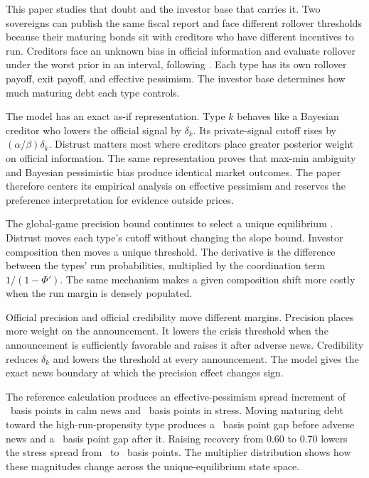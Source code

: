 \documentclass[11pt]{article}
\theoremstyle{definition}
\begin{document}
This paper studies that doubt and the investor base that carries it. Two sovereigns can publish the same fiscal report and face different rollover thresholds because their maturing bonds sit with creditors who have different incentives to run. Creditors face an unknown bias in official information and evaluate rollover under the worst prior in an interval, following \citet{GilboaSchmeidler1989}. Each type has its own rollover payoff, exit payoff, and effective pessimism. The investor base determines how much maturing debt each type controls.

The model has an exact as-if representation. Type $k$ behaves like a Bayesian creditor who lowers the official signal by $\delta_k$. Its private-signal cutoff rises by $(\alpha/\beta)\delta_k$. Distrust matters most where creditors place greater posterior weight on official information. The same representation proves that max-min ambiguity and Bayesian pessimistic bias produce identical market outcomes. The paper therefore centers its empirical analysis on effective pessimism and reserves the preference interpretation for evidence outside prices.

The global-game precision bound continues to select a unique equilibrium \citep{Hellwig2002,MorrisShin2003}. Distrust moves each type's cutoff without changing the slope bound. Investor composition then moves a unique threshold. The derivative is the difference between the types' run probabilities, multiplied by the coordination term $1/(1-\Phi')$. The same mechanism makes a given composition shift more costly when the run margin is densely populated.

Official precision and official credibility move different margins. Precision places more weight on the announcement. It lowers the crisis threshold when the announcement is sufficiently favorable and raises it after adverse news. Credibility reduces $\delta_k$ and lowers the threshold at every announcement. The model gives the exact news boundary at which the precision effect changes sign.

The reference calculation produces an effective-pessimism spread increment of \PremCalm\ basis points in calm news and \PremStress\ basis points in stress. Moving maturing debt toward the high-run-propensity type produces a \QTPremCalm\ basis point gap before adverse news and a \QTPremShock\ basis point gap after it. Raising recovery from 0.60 to 0.70 lowers the stress spread from \CACSBase\ to \CACSNew\ basis points. The multiplier distribution shows how these magnitudes change across the unique-equilibrium state space.
\end{document}
